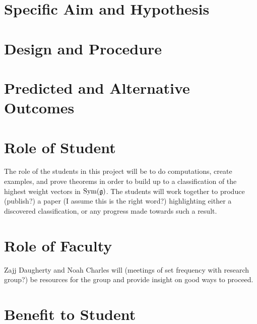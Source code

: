 \documentclass[11pt, reqno]{amsart}
\begin{document}

\section{Specific Aim and Hypothesis}


\section{Design and Procedure}

\section{Predicted and Alternative Outcomes}

\section{Role of Student}

The role of the students in this project will be to do computations, create examples, and prove theorems in order to build up to a classification of the highest weight vectors in $\operatorname{Sym}(\mathfrak{g})$. The students will work together to produce (publish?) a paper (I assume this is the right word?) highlighting either a discovered classification, or any progress made towards such a result.

\section{Role of Faculty}

Zajj Daugherty and Noah Charles will (meetings of set frequency with research group?) be resources for the group and provide insight on good ways to proceed. %

\section{Benefit to Student}


\printbibliography{}
\end{document}

